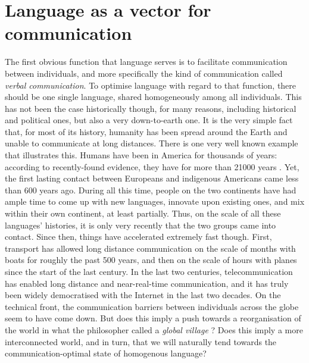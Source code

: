 \documentclass[../thesis.tex]{subfiles}
\begin{document}
\section{Language as a vector for communication}
The first obvious function that language serves is to facilitate communication between
individuals, and more specifically the kind of communication called \emph{verbal
communication}. To optimise language with regard to that function, there should be
one single language, shared homogeneously among all individuals. This has not been the
case historically though, for many reasons, including historical and political ones, but
also a very down-to-earth one. It is the very simple fact that, for most of its history,
humanity has been spread around the Earth and unable to communicate at long distances.
There is one very well known example that illustrates this. Humans have been in America
for thousands of years: according to recently-found evidence, they have for more than
\SI{21000}{} years \cite{BennettEvidenceHumans2021}. Yet, the first lasting contact
between Europeans and indigenous Americans came less than 600 years ago. During all this
time, people on the two continents have had ample time to come up with new languages,
innovate upon existing ones, and mix within their own continent, at least partially.
Thus, on the scale of all these languages' histories, it is only very recently that the
two groups came into contact. Since then, things have accelerated extremely fast though.
First, transport has allowed long distance communication on the scale of months with
boats for roughly the past 500 years, and then on the scale of hours with planes since
the start of the last century. In the last two centuries, telecommunication has enabled
long distance and near-real-time communication, and it has truly been widely
democratised with the Internet in the last two decades. On the technical front, the
communication barriers between individuals across the globe seem to have come down. But
does this imply a push towards a reorganisation of the world in what the philosopher
 called a \emph{global village}
\cite{McLuhanGutenbergGalaxy2008}? Does this imply a more interconnected world, and in
turn, that we will naturally tend towards the communication-optimal state of homogenous
language?

\end{document}
